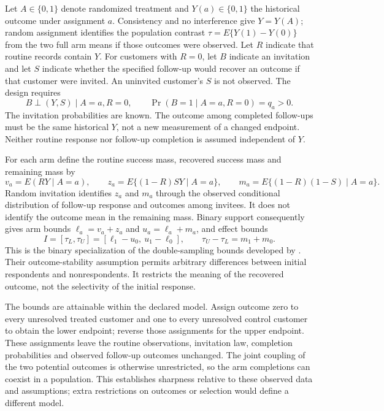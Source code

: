 Let $A\in\{0,1\}$ denote randomized treatment and $Y(a)\in\{0,1\}$ the
historical outcome under assignment $a$. Consistency and no interference give
$Y=Y(A)$; random assignment identifies the population contrast
$\tau=E\{Y(1)-Y(0)\}$ from the two full arm means if those outcomes were
observed. Let $R$ indicate that routine records contain $Y$. For customers
with $R=0$, let $B$ indicate an invitation and let $S$ indicate whether the
specified follow-up would recover an outcome if that customer were invited.
An uninvited customer's $S$ is not observed. The design requires
\[
 B\mathbin{\perp}(Y,S)\mid A=a,R=0,\qquad
 \Pr(B=1\mid A=a,R=0)=q_a>0.
\]
The invitation probabilities are known. The outcome among completed
follow-ups must be the same historical $Y$, not a new measurement of a
changed endpoint. Neither routine response nor follow-up completion is
assumed independent of $Y$.

For each arm define the routine success mass, recovered success mass and
remaining mass by
\[
 v_a=E(RY\mid A=a),\qquad
 z_a=E\{(1-R)SY\mid A=a\},\qquad
 m_a=E\{(1-R)(1-S)\mid A=a\}.
\]
Random invitation identifies $z_a$ and $m_a$ through the observed conditional
distribution of follow-up response and outcomes among invitees. It does not
identify the outcome mean in the remaining mass. Binary support consequently
gives arm bounds $\ell_a=v_a+z_a$ and $u_a=\ell_a+m_a$, and effect bounds
\begin{equation}
 I=[\tau_L,\tau_U]=[\ell_1-u_0,\ u_1-\ell_0],\qquad
 \tau_U-\tau_L=m_1+m_0.
 \label{rel73:identified-set}
\end{equation}
This is the binary specialization of the double-sampling bounds developed
by \citet{rel73coppock2017}. Their outcome-stability assumption permits
arbitrary differences between initial respondents and nonrespondents. It
restricts the meaning of the recovered outcome, not the selectivity of the
initial response.

The bounds are attainable within the declared model. Assign outcome zero
to every unresolved treated customer and one to every unresolved control
customer to obtain the lower endpoint; reverse those assignments for the
upper endpoint. These assignments leave the routine observations,
invitation law, completion probabilities and observed follow-up outcomes
unchanged. The joint coupling of the two potential outcomes is otherwise
unrestricted, so the arm completions can coexist in a population. This
establishes sharpness relative to these observed data and assumptions; extra
restrictions on outcomes or selection would define a different model.

